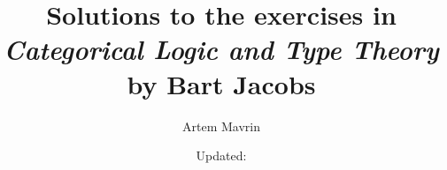 \usepackage{defs}

\title{\texorpdfstring{%
Solutions to the exercises in\\
\emph{Categorical Logic and Type Theory}\\
by Bart Jacobs}%
{Categorical Logic and Type Theory Solutions}}
\author{Artem Mavrin}
\date{\small Updated: \texttt{\DTMNow}}


